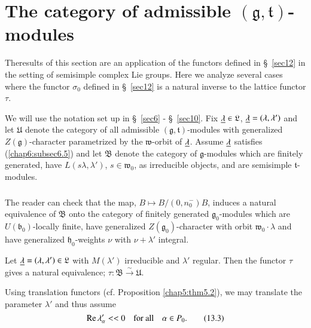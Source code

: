 
\chapter{The category of admissible $(\mathfrak{g},
  \mathfrak{t})$-modules}\label{sec13}

The\pageoriginale results of this section are an application of the
functors defined in \S\ \ref{sec12} in the setting of semisimple complex Lie
groups. Here we analyze several cases where the functor $\sigma_0$
defined in \S\ \ref{sec12} is a natural inverse to the lattice functor
$\tau$. 

We will use the notation set up in \S\ \ref{sec6} - \S\ \ref{sec10}. Fix $\underline{\lambda} \in
\mathfrak{L}$, $\underline{\lambda} = (\lambda, \lambda')$ and let
$\mathfrak{U}$ denote the category of all admissible $(\mathfrak{g},
\mathfrak{t})$-modules with generalized $Z(\mathfrak{g})$-character
parametrized by the $\mathfrak{w}$-orbit of $\underline{\lambda}$. Assume
$\underline{\lambda}$ satisfies (\ref{chap6:subsec6.5}) and let $\mathfrak{B}$ denote the
category of $\mathfrak{g}$-modules which are finitely generated, have
$L(s\lambda, \lambda')$, $s \in \mathfrak{w}_0$, as irreducible
objects, and are semisimple $\mathfrak{t}$-modules. 

\setcounter{section}{13}
\setcounter{subsection}{0}
\subsection{}\label{chap13:subsec13.1}
The reader can check that the map, $B \mapsto B/(0, n^-_0)B$, induces
a natural equivalence of $\mathfrak{B}$ onto the category of finitely
generated $\mathfrak{g}_0$-modules which are
$U(\mathfrak{b}_0)$-locally finite, have generalized
$Z(\mathfrak{g}_0)$-character with orbit $\mathfrak{w}_0 \cdot
\lambda$  and have generalized $\mathfrak{h}_0$-weights $\nu$ with
$\nu + \lambda'$ integral. 

\setcounter{prop}{1}
\begin{theorem}\label{chap13:thm13.2}
Let $\underline{\lambda} = (\lambda, \lambda') \in \mathfrak{L}$ with
$M(\lambda')$ irreducible and $\lambda'$ regular. Then the functor
$\tau$ gives a natural equivalence; $\tau : \mathfrak{B}
\xrightarrow{\sim} \mathfrak{U}$. 
\end{theorem}

Using translation functors (cf. Proposition \ref{chap5:thm5.2}), we may translate the
parameter $\lambda'$ and thus assume
\begin{equation*}
\operatorname{Re} \lambda'_\alpha <<  0 \quad \text{for all} \quad \alpha \in
P_0. \tag{13.3} \label{eq13.3}
\end{equation*}

